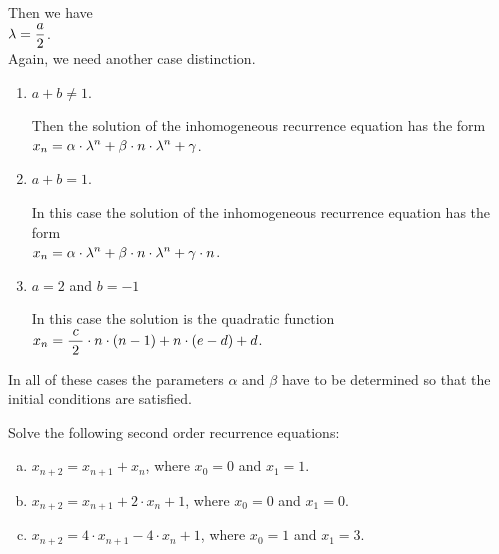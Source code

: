 \begin{enumerate}
      Then we have 
      \\[0.2cm]
      \hspace*{1.3cm}
      $\displaystyle \lambda = \frac{a}{2}$.
      \\[0.2cm]
      Again, we need another case distinction.
      \begin{enumerate}
      \item $a + b \not= 1$.

            Then the solution of the inhomogeneous recurrence equation has the form
            \\[0.2cm]
            \hspace*{1.3cm}
            $\displaystyle x_{n} = \alpha \cdot \lambda^n + \beta \cdot n \cdot \lambda^n + \gamma$.
      \item $a + b = 1$.

            In this case the solution of the inhomogeneous recurrence equation has the form
            \\[0.2cm]
            \hspace*{1.3cm}
            $\displaystyle x_{n} = \alpha \cdot \lambda^n + \beta \cdot n \cdot \lambda^n + \gamma \cdot n$.
      \item $a = 2$ and $b = -1$

            In this case the solution is the quadratic function
            \\[0.2cm]
            \hspace*{1.3cm}
            $x_n = \displaystyle \frac{\;c\;}{2} \cdot n \cdot (n-1) + n \cdot (e - d) + d$.
      \end{enumerate}
\end{enumerate}
In all of these cases the parameters $\alpha$ and $\beta$ have to be determined so that the initial conditions
are satisfied.

\exercise
Solve the following second order recurrence equations:
\begin{enumerate}[(a)]
\item $x_{n+2} = x_{n+1} + x_n$, \quad where $x_0 = 0$ and $x_1 = 1$.  
\item $x_{n+2} = x_{n+1} + 2 \cdot x_n + 1$, \quad where $x_0 = 0$ and $x_1 = 0$.  
\item $x_{n+2} = 4 \cdot x_{n+1} - 4 \cdot x_n + 1$, \quad where $x_0 = 1$ and $x_1 = 3$.  \eox
\end{enumerate}

